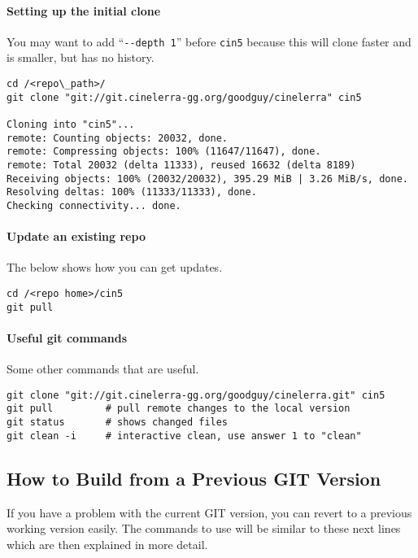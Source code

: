 \paragraph{Setting up the initial clone}%
\label{par:setting_up_the_initial_clone}

You may want to add ``\verb|--depth 1|'' before \texttt{cin5}
because this will clone faster and is smaller, but has no history.

\begin{lstlisting}[style=sh]
cd /<repo\_path>/
git clone "git://git.cinelerra-gg.org/goodguy/cinelerra" cin5

Cloning into "cin5"...
remote: Counting objects: 20032, done.
remote: Compressing objects: 100% (11647/11647), done.
remote: Total 20032 (delta 11333), reused 16632 (delta 8189)
Receiving objects: 100% (20032/20032), 395.29 MiB | 3.26 MiB/s, done.
Resolving deltas: 100% (11333/11333), done.
Checking connectivity... done.
\end{lstlisting}


\paragraph{Update an existing repo}%
\label{par:update_an_existing_repo}
The below shows how you can get updates.

\begin{lstlisting}[style=sh]
cd /<repo home>/cin5
git pull
\end{lstlisting}


\paragraph{Useful git commands}%
\label{par:useful_git_commands}
Some other commands that are useful.

\begin{lstlisting}[style=sh]
git clone "git://git.cinelerra-gg.org/goodguy/cinelerra.git" cin5
git pull         # pull remote changes to the local version
git status       # shows changed files
git clean -i     # interactive clean, use answer 1 to "clean"
\end{lstlisting}


\subsection{How to Build from a Previous GIT Version}%
\label{sub:how_to_build_from_a_previous_git_version}

If you have a problem with the current GIT version, you can revert
to a previous working version easily.  The commands to use will be
similar to these next lines which are then explained in more detail.
\strut
 
